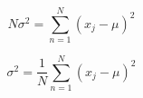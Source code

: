 \documentclass[a4paper,10pt]{article}
\begin{document}
\begin{equation*}
N\sigma^2 = \sum_{n = 1}^{N} (x_j - \mu)^2
\end{equation*}

\begin{equation*}
\sigma^2 = \frac{1}{N}\sum_{n = 1}^{N} (x_j - \mu)^2
\end{equation*}

% 
% 
% 

% 
% 
% 


\end{document}
